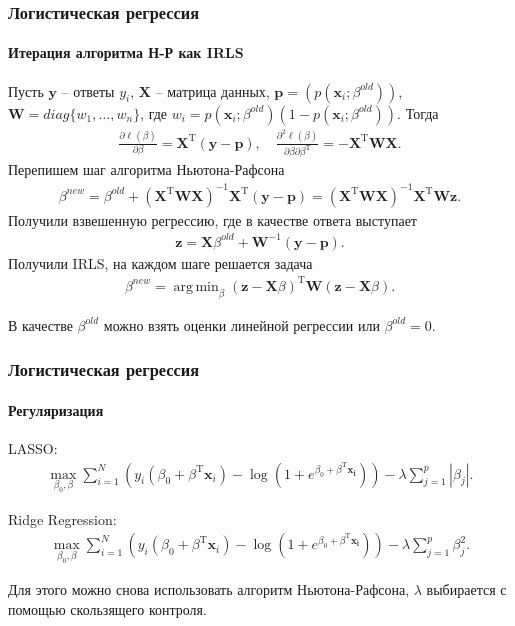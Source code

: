 \documentclass{beamer}
\DeclareMathOperator*{\argmin}{arg\,min}
\begin{document}
\begin{frame}
  \frametitle{Логистическая регрессия}
  \framesubtitle{Итерация алгоритма Н-Р как IRLS}
Пусть $\mathbf{y}$ -- ответы $y_i$, $\mathbf{X}$ -- матрица данных, $\mathbf{p} = (p(\mathbf{x}_i; \beta^{old}))$, $\mathbf{W} = diag\{w_1, \ldots, w_n\}$, где $w_{i} = p(\mathbf{x}_i;\beta^{old})(1 - p(\mathbf{x}_i; \beta^{old}))$. Тогда
  \begin{align*}
      \frac{\partial \ell(\beta)}{\partial \beta} = \mathbf{X}^\mathrm{T}(\mathbf{y} - \mathbf{p}), \quad
      \frac{\partial^2 \ell(\beta)}{\partial \beta \partial \beta^{\mathrm{T}}} = -\mathbf{X}^\mathrm{T}\mathbf{W}\mathbf{X}.
  \end{align*}
  Перепишем шаг алгоритма Ньютона-Рафсона
  \begin{align*}
    \beta^{new} = \beta^{old} + (\mathbf{X}^\mathrm{T}\mathbf{W}\mathbf{X})^{-1}\mathbf{X}^\mathrm{T}(\mathbf{y} - \mathbf{p})
    = (\mathbf{X}^\mathrm{T}\mathbf{W}\mathbf{X})^{-1}\mathbf{X}^\mathrm{T}\mathbf{W}\mathbf{z}.
  \end{align*}
Получили взвешенную регрессию, где в качестве ответа выступает
  \begin{align*}
    \mathbf{z} = \mathbf{X}\beta^{old} + \mathbf{W}^{-1}(\mathbf{y} - \mathbf{p}).
  \end{align*}
 Получили IRLS, на каждом шаге решается задача
  \begin{align*}
    \beta^{new} = \argmin_\beta (\mathbf{z} - \mathbf{X}\beta)^\mathrm{T} \mathbf{W}(\mathbf{z} - \mathbf{X}\beta).
  \end{align*}

  В качестве $\beta^{old}$ можно взять оценки линейной регрессии или $\beta^{old} = 0$.
\end{frame}
\begin{frame}
  \frametitle{Логистическая регрессия}
  \framesubtitle{Регуляризация}
  LASSO:
  \begin{align*}
    \max_{\beta_0, \beta} \sum\limits_{i = 1}^N \left( y_i(\beta_0 + \beta^\mathrm{T}\mathbf{x}_i) - \log (1 + e^{\beta_0 + \beta^\mathrm{T}\mathbf{x_i}})\right) - \lambda \sum\limits_{j = 1}^p |\beta_j|.
  \end{align*}

Ridge Regression:
\begin{align*}
  \max_{\beta_0, \beta} \sum\limits_{i = 1}^N \left( y_i(\beta_0 + \beta^\mathrm{T}\mathbf{x}_i) - \log (1 + e^{\beta_0 + \beta^\mathrm{T}\mathbf{x_i}})\right) - \lambda \sum\limits_{j = 1}^p \beta_j^2.
\end{align*}

  Для этого можно снова использовать алгоритм Ньютона-Рафсона, $\lambda$ выбирается с помощью скользящего контроля.
\end{frame}
\end{document}
